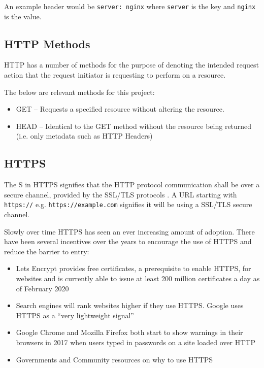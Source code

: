 \documentclass{mscreport}
\begin{document}
\vspace{0.3cm} \noindent
An example header would be \texttt{server: nginx} where \texttt{server} is the key and \texttt{nginx} is the value.

\subsection{HTTP Methods}

\noindent HTTP has a number of methods for the purpose of denoting the intended request action that the request initiator is requesting to perform on a resource.

\vspace{0.3cm} \noindent
The below are relevant methods for this project:
\begin{itemize}
	\setlength\itemsep{0.1em}
	\item GET – Requests a specified resource without altering the resource.
	\item HEAD – Identical to the GET method without the resource being returned (i.e. only metadata such as HTTP Headers)
\end{itemize}

\subsection{HTTPS}

\noindent The S in HTTPS signifies that the HTTP protocol communication shall be over a secure channel, provided by the SSL/TLS protocols \cite{Rescorla2000-fs}. A URL starting with \texttt{https://} e.g. \texttt{https://example.com} signifies it will be using a SSL/TLS secure channel.

\vspace{0.3cm}
\noindent Slowly over time HTTPS has seen an ever increasing amount of adoption. There have been several incentives over the years to encourage the use of HTTPS and reduce the barrier to entry:

\begin{itemize}
	\setlength\itemsep{0.1em}
	\item Lets Encrypt provides free certificates, a prerequisite to enable HTTPS, for websites and is currently able to issue at least 200 million certificates a day as of February 2020 \cite{noauthor_undated-bi}
	\item Search engines will rank websites higher if they use HTTPS. Google uses HTTPS as a ``very lightweight signal'' \cite{noauthor_undated-im}
	\item Google Chrome and Mozilla Firefox both start to show warnings in their browsers in 2017 when users typed in passwords on a site loaded over HTTP \cite{Vyas2017-ds,Google_undated-ws}
	\item Governments and Community resources on why to use HTTPS \cite{noauthor_undated-oz,noauthor_undated-xk}
\end{itemize}
\end{document}

